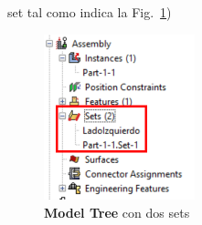 \begin{enumerate}
  set tal como indica la Fig.~\ref{figu28})
  \begin{figure}[H]
    \centering
    \includegraphics[width=0.39\textwidth]{./body/images/imagen28.pdf}
    \caption{\textbf{Model Tree} con dos sets}
    \label{figu28}
  \end{figure}
\end{enumerate}
\newpage
